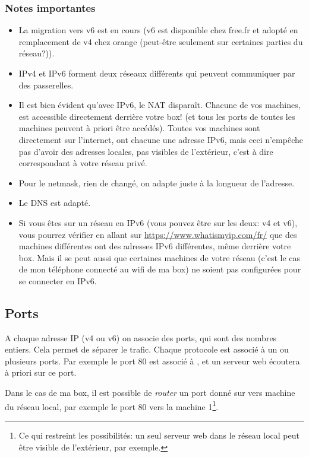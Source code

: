   \subsubsection{Notes importantes}
  \begin{itemize}
    \item La migration vers v6 est en cours (v6 est disponible chez
    free.fr et adopté en remplacement de v4 chez orange (peut-être
    seulement sur certaines parties du réseau?)).
    \item IPv4 et IPv6 forment deux réseaux différents qui peuvent
      communiquer par des passerelles.
    \item Il est bien évident qu'avec IPv6, le NAT disparaît. Chacune
      de vos machines, est accessible directement derrière votre
      box! (et tous les ports de toutes les machines peuvent à priori
      être accédés). Toutes vos machines sont directement sur
      l'internet, ont chacune une adresse IPv6,  mais ceci n'empêche
      pas d'avoir des adresses 
      locales, pas visibles de l'extérieur, c'est à dire correspondant à
      votre réseau privé.
    \item Pour le netmask, rien de changé, on adapte juste à la
      longueur de l'adresse.
    \item Le DNS est adapté.
    \item Si vous êtes sur un réseau en IPv6 (vous pouvez être sur les
      deux: v4 et v6), vous pourrez vérifier en allant sur
      \url{https://www.whatismyip.com/fr/} que des machines
      différentes ont des adresses IPv6 différentes, même derrière
      votre box. Mais il se peut aussi que certaines machines de votre
      réseau (c'est le cas de mon téléphone connecté au wifi de ma
      box) ne soient pas configurées pour se connecter en IPv6.
  \end{itemize}

\subsection{Ports} A chaque adresse IP (v4 ou v6) on associe des ports, qui sont
des nombres entiers. Cela permet de séparer le trafic. Chaque protocole
est associé à un ou plusieurs ports. Par exemple le port 80 est
associé à , et un serveur web écoutera à priori sur ce port.

Dans le cas de ma box, il est possible de \emph{router} un port donné
sur vers machine du réseau local, par exemple le port 80 vers la
machine 1\footnote{Ce qui restreint les possibilités: un seul serveur
  web  dans le réseau local peut être visible de l'extérieur, par exemple.}.

    
